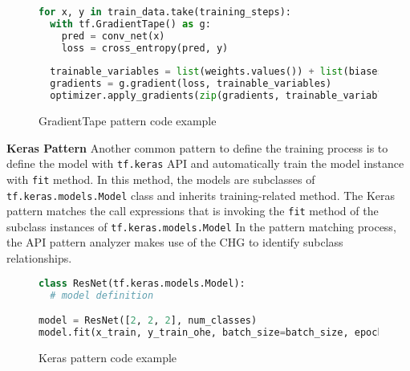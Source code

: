 \begin{figure}[!ht]
  \begin{lstlisting}[language=Python]
for x, y in train_data.take(training_steps):
  with tf.GradientTape() as g:
    pred = conv_net(x)
    loss = cross_entropy(pred, y)
    
  trainable_variables = list(weights.values()) + list(biases.values())
  gradients = g.gradient(loss, trainable_variables)
  optimizer.apply_gradients(zip(gradients, trainable_variables))
  \end{lstlisting}
  \caption{GradientTape pattern code example}
\end{figure}

\textbf{Keras Pattern}
Another common pattern to define the training process is to define
the model with {\tt tf.keras} API and automatically train the model
instance with {\tt fit} method.
In this method, the models are subclasses of {\tt tf.keras.models.Model} class
and inherits training-related method.
The Keras pattern matches the call expressions that is invoking the {\tt fit}
method of the subclass instances of {\tt tf.keras.models.Model}
In the pattern matching process, the API pattern analyzer
makes use of the CHG to identify subclass relationships. 

\begin{figure}[!ht]
  \begin{lstlisting}[language=Python]
class ResNet(tf.keras.models.Model):
  # model definition

model = ResNet([2, 2, 2], num_classes)
model.fit(x_train, y_train_ohe, batch_size=batch_size, epochs=epochs,
  \end{lstlisting}
  \caption{Keras pattern code example}
\end{figure}

